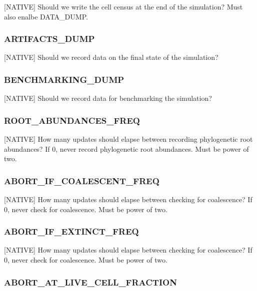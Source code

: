 
[NATIVE] Should we write the cell census at the end of the simulation? Must also enalbe DATA\_DUMP.

\subsubsection{ARTIFACTS\_DUMP}


[NATIVE] Should we record data on the final state of the simulation?

\subsubsection{BENCHMARKING\_DUMP}


[NATIVE] Should we record data for benchmarking the simulation?

\subsubsection{ROOT\_ABUNDANCES\_FREQ}


[NATIVE] How many updates should elapse between recording phylogenetic root abundances? If 0, never record phylogenetic root abundances. Must be power of two.

\subsubsection{ABORT\_IF\_COALESCENT\_FREQ}


[NATIVE] How many updates should elapse between checking for coalescence? If 0, never check for coalescence. Must be power of two.

\subsubsection{ABORT\_IF\_EXTINCT\_FREQ}


[NATIVE] How many updates should elapse between checking for coalescence? If 0, never check for coalescence. Must be power of two.

\subsubsection{ABORT\_AT\_LIVE\_CELL\_FRACTION}

